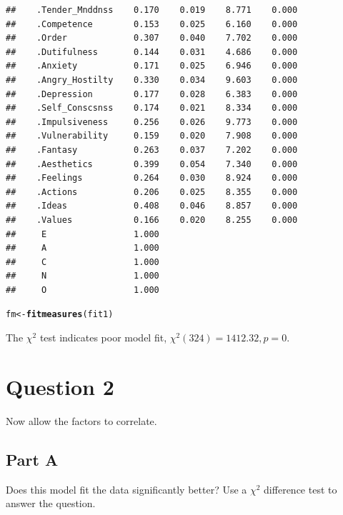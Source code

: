 \documentclass{article}\usepackage[]{graphicx}\usepackage[]{color}
\makeatletter
\newcommand{\hlstd}[1]{\textcolor[rgb]{0.345,0.345,0.345}{#1}}%
\newcommand{\hlkwb}[1]{\textcolor[rgb]{0.69,0.353,0.396}{#1}}%
\newcommand{\hlkwd}[1]{\textcolor[rgb]{0.737,0.353,0.396}{\textbf{#1}}}%
\newenvironment{kframe}{%
 \def\at@end@of@kframe{}%
 \ifinner\ifhmode%
  \def\at@end@of@kframe{\end{minipage}}%
  \begin{minipage}{\columnwidth}%
 \fi\fi%
 \def\FrameCommand##1{\hskip\@totalleftmargin \hskip-\fboxsep
 \colorbox{shadecolor}{##1}\hskip-\fboxsep
     \hskip-\linewidth \hskip-\@totalleftmargin \hskip\columnwidth}%
 \MakeFramed {\advance\hsize-\width
   \@totalleftmargin\z@ \linewidth\hsize
   \@setminipage}}%
 {\par\unskip\endMakeFramed%
 \at@end@of@kframe}
\newenvironment{knitrout}{}{} %
\makeatother
\begin{document}
\begin{knitrout}
\begin{kframe}
\begin{verbatim}
##    .Tender_Mnddnss    0.170    0.019    8.771    0.000
##    .Competence        0.153    0.025    6.160    0.000
##    .Order             0.307    0.040    7.702    0.000
##    .Dutifulness       0.144    0.031    4.686    0.000
##    .Anxiety           0.171    0.025    6.946    0.000
##    .Angry_Hostilty    0.330    0.034    9.603    0.000
##    .Depression        0.177    0.028    6.383    0.000
##    .Self_Conscsnss    0.174    0.021    8.334    0.000
##    .Impulsiveness     0.256    0.026    9.773    0.000
##    .Vulnerability     0.159    0.020    7.908    0.000
##    .Fantasy           0.263    0.037    7.202    0.000
##    .Aesthetics        0.399    0.054    7.340    0.000
##    .Feelings          0.264    0.030    8.924    0.000
##    .Actions           0.206    0.025    8.355    0.000
##    .Ideas             0.408    0.046    8.857    0.000
##    .Values            0.166    0.020    8.255    0.000
##     E                 1.000                           
##     A                 1.000                           
##     C                 1.000                           
##     N                 1.000                           
##     O                 1.000
\end{verbatim}
\begin{alltt}
\hlstd{fm} \hlkwb{<-} \hlkwd{fitmeasures}\hlstd{(fit1)}
\end{alltt}
\end{kframe}
\end{knitrout}

The $\chi^2$ test indicates poor model fit, $\chi^2(324) = 1412.32, p = 0$. 


\section{Question 2}
Now allow the factors to correlate.  

\subsection{Part A}
Does this model fit the data significantly better? Use a $\chi^2$ difference test to answer the question.
\end{document}
